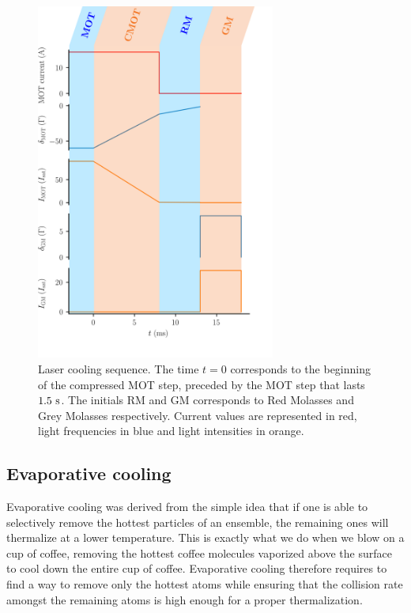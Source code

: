\begin{figure}
    \centering
    \includegraphics[width=0.7\textwidth]{Fig/Chapter3/laser_cooling.png}
    \caption[Laser cooling sequence]{Laser cooling sequence. The time $t=0$ corresponds to the beginning of the compressed MOT step, preceded by the MOT step that lasts $1.5 \ \rm{s}$. The initials RM and GM corresponds to Red Molasses and Grey Molasses respectively. Current values are represented in red, light frequencies in blue and light intensities in orange.}
    \label{fig:my_label}
\end{figure}

\subsection{Evaporative cooling}

Evaporative cooling was derived from the simple idea that if one is able to selectively remove the hottest particles of an ensemble, the remaining ones will thermalize at a lower temperature. This is exactly what we do when we blow on a cup of coffee, removing the hottest coffee molecules vaporized above the surface to cool down the entire cup of coffee. Evaporative cooling therefore requires to find a way to remove only the hottest atoms while ensuring that the collision rate amongst the remaining atoms is high enough for a proper thermalization. 

